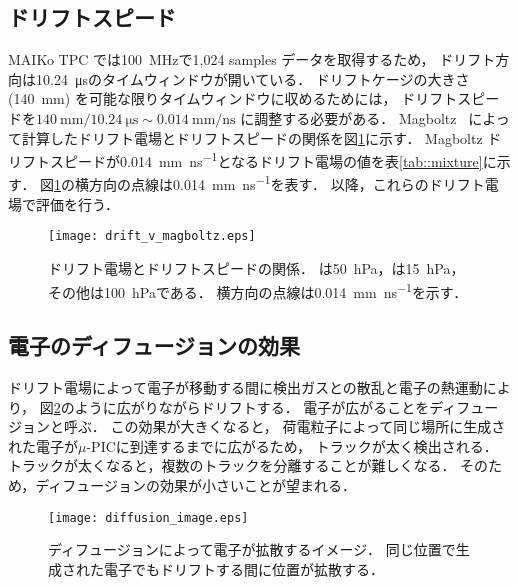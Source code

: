 \documentclass[../master]{subfiles}
\begin{document}
\subsection{ドリフトスピード}
MAIKo TPC では\SI{100}{\mega\hertz}で1,024 samples データを取得するため，
ドリフト方向は\SI{10.24}{\micro\second}のタイムウィンドウが開いている．
ドリフトケージの大きさ (\SI{140}{\milli\metre}) を可能な限りタイムウィンドウに収めるためには，
ドリフトスピードを$\SI{140}{\milli\metre}/\SI{10.24}{\micro\second} \sim \SI{0.014}{\milli\metre\per\nano\second}$
に調整する必要がある．
Magboltz~\cite{magboltz} によって計算したドリフト電場とドリフトスピードの関係を図\ref{fig::drift_v_magboltz}に示す．
Magboltz ドリフトスピードが\SI{0.014}{\milli\metre\per\nano\second}となるドリフト電場の値を表\ref{tab::mixture}に示す．
図\ref{fig::drift_v_magboltz}の横方向の点線は\SI{0.014}{\milli\metre\per\nano\second}を表す．
以降，これらのドリフト電場で評価を行う．
\begin{figure}
  \centering
  \texttt{[image: drift\_v\_magboltz.eps]}
  \caption[ドリフト電場とドリフトスピードの関係．]
          {ドリフト電場とドリフトスピードの関係．
            \Methane は\SI{50}{\hecto\pascal}，\isoButane は\SI{15}{\hecto\pascal}，その他は\SI{100}{\hecto\pascal}である．
            横方向の点線は\SI{0.014}{\milli\metre\per\nano\second}を示す．}
          \label{fig::drift_v_magboltz}
\end{figure}

\subsection{電子のディフュージョンの効果}
ドリフト電場によって電子が移動する間に検出ガスとの散乱と電子の熱運動により，
図\ref{fig::diffusion-image}のように広がりながらドリフトする．
電子が広がることをディフュージョンと呼ぶ．
この効果が大きくなると，
荷電粒子によって同じ場所に生成された電子が$\mu$-PICに到達するまでに広がるため，
トラックが太く検出される．
トラックが太くなると，複数のトラックを分離することが難しくなる．
そのため，ディフュージョンの効果が小さいことが望まれる．
\begin{figure}
  \centering
  \texttt{[image: diffusion\_image.eps]}
  \caption[ディフュージョンによって電子が拡散するイメージ．]
          {ディフュージョンによって電子が拡散するイメージ．
          同じ位置で生成された電子でもドリフトする間に位置が拡散する．}
  \label{fig::diffusion-image}
\end{figure}
\end{document}
